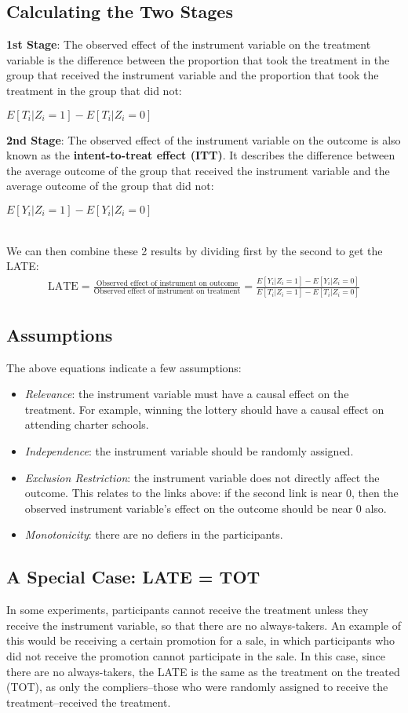 \documentclass{article}
\begin{document}
\subsection{Calculating the Two Stages}
\textbf{1st Stage}: The observed effect of the instrument variable on the treatment variable is the difference between the proportion that took the treatment in the group that received the instrument variable and the proportion that took the treatment in the group that did not:
\\
\centerline{$E[T_i|Z_i=1]-E[T_i|Z_i=0]$}
\textbf{2nd Stage}: The observed effect of the instrument variable on the outcome is also known as the \textbf{intent-to-treat effect (ITT)}. 
It describes the difference between the average outcome of the group that received the instrument variable and the average outcome of the group that did not:
\\
\centerline{$E[Y_i|Z_i=1]-E[Y_i|Z_i=0]$}
\\
We can then combine these 2 results by dividing first by the second to get the LATE:
\begin{gather*}
\textrm{LATE} = \frac{\textrm{Observed effect of instrument on outcome}}{\textrm{Observed effect of instrument on treatment}} = \frac{E[Y_i|Z_i=1]-E[Y_i|Z_i=0]}{E[T_i|Z_i=1]-E[T_i|Z_i=0]}
\end{gather*} 


\subsection{Assumptions}
The above equations indicate a few assumptions:
\begin{itemize}
    \item \textit{Relevance}: the instrument variable must have a causal effect on the treatment. For example, winning the lottery should have a causal effect on attending charter schools.
    \item \textit{Independence}: the instrument variable should be randomly assigned.
    \item \textit{Exclusion Restriction}: the instrument variable does not directly affect the outcome. This relates to the links above: if the second link is near 0, then the observed instrument variable's effect on the outcome should be near 0 also.
    \item \textit{Monotonicity}: there are no defiers in the participants. 
\end{itemize}

\subsection{A Special Case: LATE = TOT}
In some experiments, participants cannot receive the treatment unless they receive the instrument variable, so that there are no always-takers. 
An example of this would be receiving a certain promotion for a sale, in which participants who did not receive the promotion cannot participate in the sale. 
In this case, since there are no always-takers, the LATE is the same as the treatment on the treated (TOT), as only the compliers–those who were randomly assigned to receive the treatment–received the treatment. 
\end{document}
